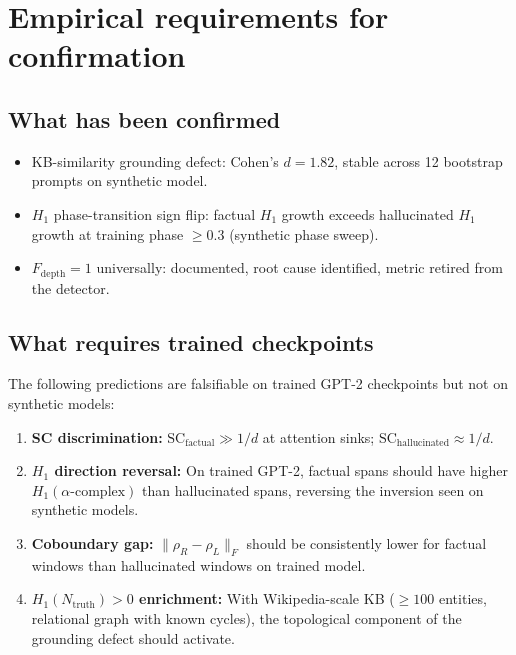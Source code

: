\documentclass[11pt]{amsart}
\theoremstyle{definition}
\newcommand{\Ntruth}{N_{\mathrm{truth}}}
\begin{document}
\section{Empirical requirements for confirmation}
\label{sec:empirical}

\subsection{What has been confirmed}

\begin{itemize}
\item KB-similarity grounding defect: Cohen's $d = 1.82$, stable across
  12 bootstrap prompts on synthetic model.
\item $H_1$ phase-transition sign flip: factual $H_1$ growth exceeds
  hallucinated $H_1$ growth at training phase $\geq 0.3$ (synthetic phase sweep).
\item $F_\mathrm{depth} = 1$ universally: documented, root cause identified,
  metric retired from the detector.
\end{itemize}

\subsection{What requires trained checkpoints}

The following predictions are falsifiable on trained GPT-2 checkpoints
but not on synthetic models:

\begin{enumerate}
\item \textbf{SC discrimination:} $\mathrm{SC}_\mathrm{factual} \gg 1/d$ at attention sinks;
  $\mathrm{SC}_\mathrm{hallucinated} \approx 1/d$.
\item \textbf{$H_1$ direction reversal:} On trained GPT-2, factual spans should
  have higher $H_1(\alpha\text{-complex})$ than hallucinated spans,
  reversing the inversion seen on synthetic models.
\item \textbf{Coboundary gap:} $\|\rho_R - \rho_L\|_F$ should be consistently
  lower for factual windows than hallucinated windows on trained model.
\item \textbf{$H_1(\Ntruth) > 0$ enrichment:} With Wikipedia-scale KB
  ($\geq 100$ entities, relational graph with known cycles), the topological
  component of the grounding defect should activate.
\end{enumerate}
\end{document}
